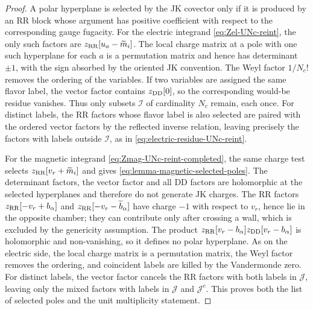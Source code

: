 \documentclass[11pt,a4paper]{article}
\numberwithin{equation}{section}
\theoremstyle{plain}
\theoremstyle{definition}
\theoremstyle{remark}
\begin{document}
\begin{proof}
A polar hyperplane is selected by the JK covector only if it is produced by an RR block whose argument has positive coefficient with respect to the corresponding gauge fugacity.  For the electric integrand \eqref{eq:Zel-UNc-reint}, the only such factors are \(z_{\rm RR}[u_a-\widetilde m_i]\).  The local charge matrix at a pole with one such hyperplane for each \(a\) is a permutation matrix and hence has determinant \(\pm1\), with the sign absorbed by the oriented JK convention.  The Weyl factor \(1/N_c!\) removes the ordering of the variables.  If two variables are assigned the same flavor label, the vector factor contains \(z_{\rm DD}[0]\), so the corresponding would-be residue vanishes.  Thus only subsets \(\mathcal I\) of cardinality \(N_c\) remain, each once.  For distinct labels, the RR factors whose flavor label is also selected are paired with the ordered vector factors by the reflected inverse relation, leaving precisely the factors with labels outside \(\mathcal I\), as in \eqref{eq:electric-residue-UNc-reint}.

For the magnetic integrand \eqref{eq:Zmag-UNc-reint-completed}, the same charge test selects \(z_{\rm RR}[v_r+\widetilde m_i]\) and gives \eqref{eq:lemma-magnetic-selected-poles}.  The determinant factors, the vector factor and all DD factors are holomorphic at the selected hyperplanes and therefore do not generate JK charges.  The RR factors \(z_{\rm RR}[-v_r+b_\alpha]\) and \(z_{\rm RR}[-v_r-\widetilde b_\alpha]\) have charge \(-1\) with respect to \(v_r\), hence lie in the opposite chamber; they can contribute only after crossing a wall, which is excluded by the genericity assumption.  The product \(z_{\rm RR}[v_r-b_\alpha]z_{\rm DD}[v_r-b_\alpha]\) is holomorphic and non-vanishing, so it defines no polar hyperplane.  As on the electric side, the local charge matrix is a permutation matrix, the Weyl factor removes the ordering, and coincident labels are killed by the Vandermonde zero.  For distinct labels, the vector factor cancels the RR factors with both labels in \(\mathcal J\), leaving only the mixed factors with labels in \(\mathcal J\) and \(\mathcal J^c\).  This proves both the list of selected poles and the unit multiplicity statement.
\end{proof}
\end{document}
